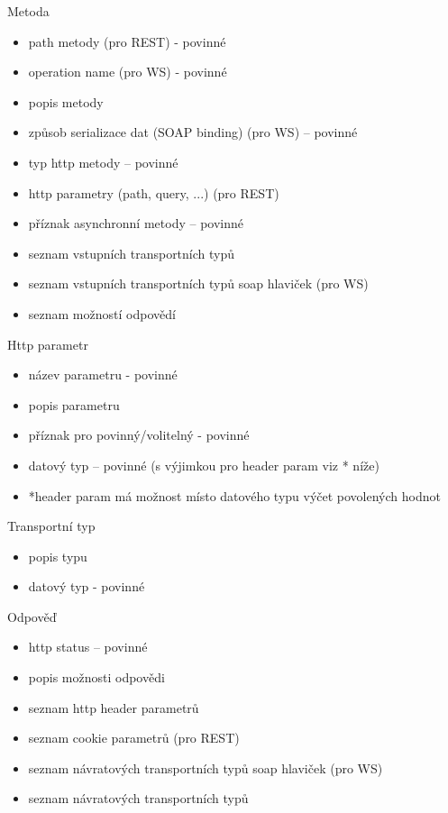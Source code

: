 \documentclass[11pt,twoside,a4paper]{book}
\begin{document}
\begin{itemize}
Metoda

\begin{itemize}
  \item path metody (pro REST) - povinné
  \item operation name (pro WS) - povinné
  \item popis metody
  \item způsob serializace dat (SOAP binding) (pro WS) – povinné
  \item typ http metody – povinné
  \item http parametry (path, query, ...) (pro REST)
  \item příznak asynchronní metody – povinné
  \item seznam vstupních transportních typů
  \item seznam vstupních transportních typů soap hlaviček (pro WS)
  \item seznam možností odpovědí
\end{itemize}

Http parametr

\begin{itemize}
  \item název parametru - povinné
  \item popis parametru
  \item příznak pro povinný/volitelný - povinné
  \item datový typ – povinné (s výjimkou pro header param viz * níže)
  \item *header param má možnost místo datového typu výčet
povolených hodnot
\end{itemize}

Transportní typ

\begin{itemize}
  \item popis typu
  \item datový typ - povinné
\end{itemize}

Odpověď

\begin{itemize}
  \item http status – povinné
  \item popis možnosti odpovědi
  \item seznam http header parametrů
  \item seznam cookie parametrů (pro REST)
  \item seznam návratových transportních typů soap hlaviček (pro WS)
  \item seznam návratových transportních typů
\end{itemize}


\end{itemize}
\end{document}
